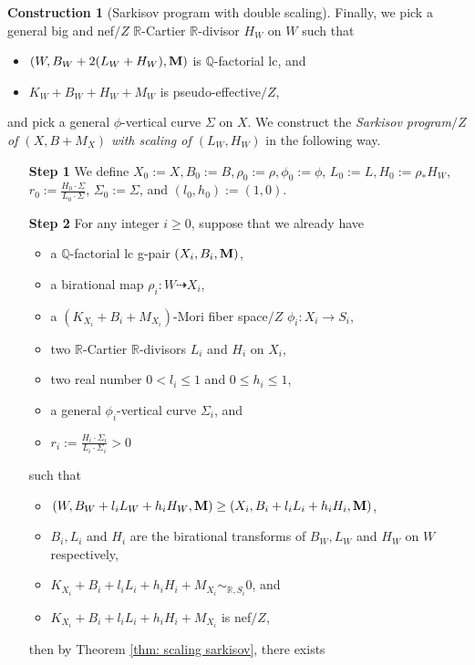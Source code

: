 \documentclass[11pt]{amsart}
\numberwithin{equation}{section}
\newcommand{\Mm}{{\bf{M}}}
\newcommand{\Qq}{\mathbb{Q}}
\newcommand{\Rr}{\mathbb{R}}
\theoremstyle{definition}
\theoremstyle{definition}
\newtheorem{cons}[thm]{Construction}
\theoremstyle{definition}
\begin{document}
\begin{cons}[Sarkisov program with double scaling]
 Finally, we pick a general big and nef$/Z$ $\mathbb{R}$-Cartier $\Rr$-divisor $H_W$ on $W$ such that
\begin{itemize}
\item $(W,B_W+2(L_W+H_W),\Mm)$ is $\Qq$-factorial lc, and
\item $K_W+B_W+H_W+M_W$ is pseudo-effective$/Z$, 
\end{itemize}
and pick a general $\phi$-vertical curve $\Sigma$ on $X$. We construct the \emph{Sarkisov program$/Z$ of $(X,B+M_{X})$ with scaling of $(L_W,H_W)$} in the following way. 
\begin{itemize}
    \item[\textbf{Step 1}] We define $X_0:=X,B_0:=B,\rho_0:=\rho,\phi_0:=\phi$, $L_0:=L, H_0:=\rho_*H_W$, $r_0:=\frac{H_0\cdot\Sigma}{L_0\cdot\Sigma}$, $\Sigma_0:=\Sigma$, and $(l_0,h_0):=(1,0)$.
    \item[\textbf{Step 2}] For any integer $i\geq 0$, suppose that we already have
    \begin{itemize}
        \item a $\Qq$-factorial lc g-pair $(X_i,B_i,\Mm)$,
        \item a birational map $\rho_i: W\dashrightarrow X_i$,
        \item a $(K_{X_i}+B_i+M_{X_i})$-Mori fiber space$/Z$ $\phi_i: X_i\rightarrow S_i$,
        \item two $\Rr$-Cartier $\Rr$-divisors $L_i$ and $H_i$ on $X_i$, 
            \item two real number $0<l_i\leq 1$ and $0\leq h_i\leq 1$, 
            \item a general $\phi_i$-vertical curve $\Sigma_i$, and
            \item $r_i:=\frac{H_i\cdot\Sigma_i}{L_i\cdot\Sigma_i}>0$
    \end{itemize}
    such that
    \begin{itemize}
        \item $(W,B_W+l_iL_W+h_iH_W,\Mm)\geq (X_i,B_i+l_iL_i+h_iH_i,\Mm)$,
        \item $B_i,L_i$ and $H_i$ are the birational transforms of $B_W,L_W$ and $H_W$ on $W$ respectively,
        \item $K_{X_i}+B_i+l_iL_i+h_iH_i+M_{X_i}\sim_{\Rr,S_i}0$, and
        \item $K_{X_i}+B_i+l_iL_i+h_iH_i+M_{X_i}$ is nef$/Z$,
    \end{itemize}
    then by Theorem \ref{thm: scaling sarkisov}, there exists 
    \begin{itemize}

\end{itemize}
\end{itemize}
\end{cons}
\end{document}
